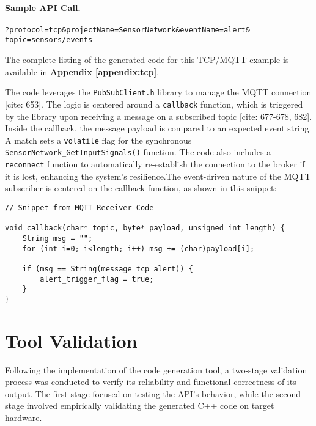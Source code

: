 \paragraph{Sample API Call.}
\begin{verbatim}
?protocol=tcp&projectName=SensorNetwork&eventName=alert&
topic=sensors/events
\end{verbatim}

The complete listing of the generated code for this TCP/MQTT example is available in \textbf{Appendix \ref{appendix:tcp}}.

The code leverages the \texttt{PubSubClient.h} library to manage the MQTT connection [cite: 653]. The logic is centered around a \texttt{callback} function, which is triggered by the library upon receiving a message on a subscribed topic [cite: 677-678, 682]. Inside the callback, the message payload is compared to an expected event string. A match sets a \texttt{volatile} flag for the synchronous \texttt{SensorNetwork\_GetInputSignals()} function. The code also includes a \texttt{reconnect} function to automatically re-establish the connection to the broker if it is lost, enhancing the system's resilience.The event-driven nature of the MQTT subscriber is centered on the callback function, as shown in this snippet:

\begin{verbatim}
// Snippet from MQTT Receiver Code

void callback(char* topic, byte* payload, unsigned int length) {
    String msg = "";
    for (int i=0; i<length; i++) msg += (char)payload[i];
    
    if (msg == String(message_tcp_alert)) {
        alert_trigger_flag = true;
    }
}
\end{verbatim}



\section{Tool Validation}
\label{sec:validation}

Following the implementation of the code generation tool, a two-stage validation process was conducted to verify its reliability and functional correctness of its output. The first stage focused on testing the API's behavior, while the second stage involved empirically validating the generated C++ code on target hardware.

